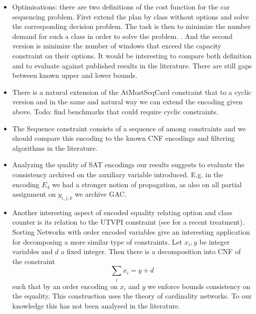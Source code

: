 \documentclass[]{llncs}
\newcommand{\AtMostSeqCard}{AtMostSeqCard }
\begin{document}
\begin{itemize}
    \item Optimisations: there are two definitions of the cost function
        for the car sequencing problem. First extend the plan by class
        without options and solve the corresponding decision problem.
        The task is then to minimize the number demand for such a class
        in order to solve the problem.  . And the second version is
        minimize the number of windows that exceed the capacity
        constraint on their options. It would be interesting to compare
        both definition and to evaluate against published results in the
        literature. There are still gaps between known upper and lower
        bounds. 
    \item There is a natural extension of the \AtMostSeqCard constraint
        that to a cyclic version and in the same and natural way we can
        extend the encoding given above. Todo: find benchmarks that
        could require cyclic constraints. 
    \item The Sequence constraint consists of a sequence of among
        constraints and we should compare this encoding to the known CNF
        encodings and filtering algorithms in the literature. 
    \item Analyzing the quality of SAT encodings our results suggests to
        evaluate the consistency archived on the auxiliary variable
        introduced. E.g. in the encoding $E_4$ we had a stronger notion
        of propagation, as also on all partial assignment on $y_{i,j,k}$
        we archive GAC. 
    \item Another interesting aspect of encoded equality relating option
        and class counter is its relation to the UTVPI constraint (see
        \cite{Seshia07} for a recent treatment). Sorting Networks with
        order encoded variables give an interesting application for
        decomposing a more similar type of constraints. Let $x_i, y$ be
        integer variables and $d$ a fixed integer. Then there is a
        decomposition into CNF of the constraint $$ \sum_i x_i = y + d
        $$ such that by an order encoding on $x_i$ and $y$ we enforce
        bounds consistency on the equality. This construction uses the
        theory of cardinality networks. To our knowledge this has not
        been analysed in the literature. 
\end{itemize}



\end{document}
